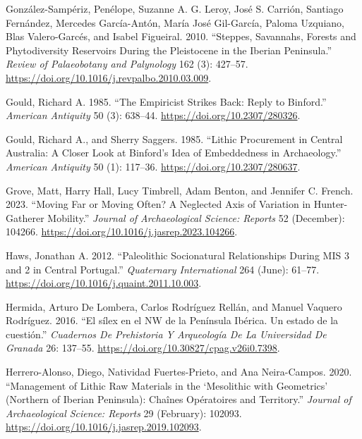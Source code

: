\documentclass[
  a4paper,
  DIV=11,
  numbers=noendperiod]{scrreprt}
\newlength{\cslhangindent}
\newenvironment{CSLReferences}[2] %
 {\begin{list}{}{%
  \setlength{\itemindent}{0pt}
  \setlength{\leftmargin}{0pt}
  \setlength{\parsep}{0pt}
  \ifodd #1
   \setlength{\leftmargin}{\cslhangindent}
   \setlength{\itemindent}{-1\cslhangindent}
  \fi
  \setlength{\itemsep}{#2\baselineskip}}}
 {\end{list}}
\begin{document}
\begin{CSLReferences}{1}{0}
González-Sampériz, Penélope, Suzanne A. G. Leroy, José S. Carrión,
Santiago Fernández, Mercedes García-Antón, María José Gil-García, Paloma
Uzquiano, Blas Valero-Garcés, and Isabel Figueiral. 2010. {``Steppes,
Savannahs, Forests and Phytodiversity Reservoirs During the
{Pleistocene} in the {Iberian Peninsula}.''} \emph{Review of
Palaeobotany and Palynology} 162 (3): 427--57.
\url{https://doi.org/10.1016/j.revpalbo.2010.03.009}.

Gould, Richard A. 1985. {``The {Empiricist Strikes Back}: {Reply} to
{Binford}.''} \emph{American Antiquity} 50 (3): 638--44.
\url{https://doi.org/10.2307/280326}.

Gould, Richard A., and Sherry Saggers. 1985. {``Lithic {Procurement} in
{Central Australia}: {A Closer Look} at {Binford}'s {Idea} of
{Embeddedness} in {Archaeology}.''} \emph{American Antiquity} 50 (1):
117--36. \url{https://doi.org/10.2307/280637}.

Grove, Matt, Harry Hall, Lucy Timbrell, Adam Benton, and Jennifer C.
French. 2023. {``Moving Far or Moving Often? {A} Neglected Axis of
Variation in Hunter-Gatherer Mobility.''} \emph{Journal of
Archaeological Science: Reports} 52 (December): 104266.
\url{https://doi.org/10.1016/j.jasrep.2023.104266}.

Haws, Jonathan A. 2012. {``Paleolithic Socionatural Relationships During
{MIS} 3 and 2 in Central {Portugal}.''} \emph{Quaternary International}
264 (June): 61--77. \url{https://doi.org/10.1016/j.quaint.2011.10.003}.

Hermida, Arturo De Lombera, Carlos Rodríguez Rellán, and Manuel Vaquero
Rodríguez. 2016. {``{El s{í}lex en el NW de la Pen{í}nsula Ib{é}rica. Un
estado de la cuesti{ó}n}.''} \emph{Cuadernos De Prehistoria Y
Arqueolog{í}a De La Universidad De Granada} 26: 137--55.
\url{https://doi.org/10.30827/cpag.v26i0.7398}.

Herrero-Alonso, Diego, Natividad Fuertes-Prieto, and Ana Neira-Campos.
2020. {``Management of Lithic Raw Materials in the {`{Mesolithic} with
Geometrics'} ({Northern} of {Iberian Peninsula}): Cha{î}nes
Op{é}ratoires and Territory.''} \emph{Journal of Archaeological Science:
Reports} 29 (February): 102093.
\url{https://doi.org/10.1016/j.jasrep.2019.102093}.


\end{CSLReferences}
\end{document}
